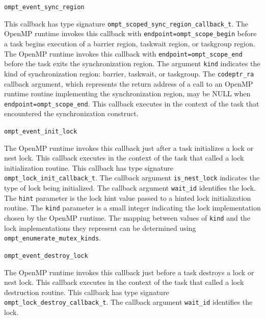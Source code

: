 \documentclass{article}
\newcommand{\descheader}[1]{{\needspace{3\baselineskip}\vspace{1em}\noindent \fbox{#1}}}
\begin{document}
\begin{description}
 
\item \verb|ompt_event_sync_region|

 \sloppy
 This callback has type signature \verb|ompt_scoped_sync_region_callback_t|. 
  The OpenMP runtime invokes this callback with \verb|endpoint=|\verb|ompt_scope_begin| before a task
  begins execution of a barrier region, taskwait region, or taskgroup region. 
   The OpenMP runtime invokes this callback with \verb|endpoint=|\verb|ompt_scope_end| before the task exits the synchronization region. 
  The argument \verb|kind| indicates the kind of synchronization region: barrier, taskwait, or taskgroup.
  The \verb|codeptr_ra| callback argument, which represents the return address of a call to an OpenMP runtime routine implementing the synchronization region,
  may be NULL when \verb|endpoint=|\verb|ompt_scope_end|.
  This callback executes in the context of the task that encountered the synchronization construct.

\end{description}

\descheader{Lock Creation and Destruction}

\begin{description}

\item \verb|ompt_event_init_lock|
 
   The OpenMP runtime invokes this callback just after a
   task initializes a lock or nest lock.  This callback executes in the
   context of the task that called a lock initialization routine.
   This callback has type signature \verb|ompt_lock_init_callback_t|. 
   The callback argument \verb|is_nest_lock| indicates the type of lock being initialized.
   The callback argument \verb|wait_id| identifies the lock. 
   The \verb|hint| parameter is the lock hint value passed to a hinted lock initialization routine.
   The \verb|kind| parameter is a small integer indicating the lock implementation chosen by the OpenMP runtime. 
   The mapping between values of \verb|kind| and the lock implementations they represent can be determined using 
   \verb|ompt_enumerate_mutex_kinds|. 

\item \verb|ompt_event_destroy_lock|
 
   The OpenMP runtime invokes this callback just before a
   task destroys a lock or nest lock.  
   This callback executes in the context of the task that called a lock destruction routine.
   This callback has type signature \verb|ompt_lock_destroy_callback_t|. 
   The callback argument \verb|wait_id| identifies the lock. 

\end{description}
\end{document}
